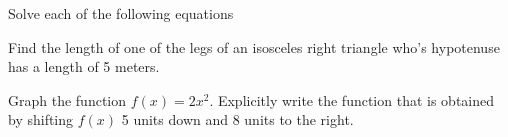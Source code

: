 \documentclass[11pt]{exam}
\begin{document}
\begin{questions}
\newpage


\addpoints
\question Solve each of the following equations

\newpage

\question[15] Find the length of one of the legs of an isosceles right triangle who's hypotenuse has a length of 5 meters.
\vfill

\question[15] Graph the function $f(x) = 2x^2$. Explicitly write the function that is obtained by shifting $f(x)$ 5 units down and 8 units to the right.
\vfill

\end{questions}
\end{document}

